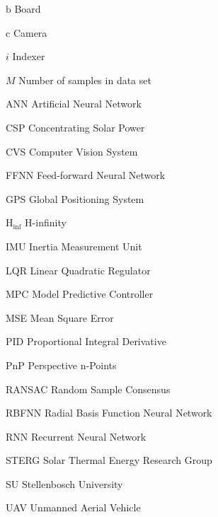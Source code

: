 \begin{Nomencl}[2cm]
   \item[$\mathrm{b}$]          Board
   \item[$\mathrm{c}$] 		Camera
   \item[$i$]			Indexer
   \item[$M$]			Number of samples in data set
\newpage
   \item[ANN]		Artificial Neural Network
   \item[CSP] 		Concentrating Solar Power
   \item[CVS] 		Computer Vision System
   \item[FFNN]		Feed-forward Neural Network
   \item[GPS] 		Global Positioning System	
   \item[H$_{\inf}$]	H-infinity 
   \item[IMU]		Inertia Measurement Unit
   \item[LQR]		Linear Quadratic Regulator
   \item[MPC]		Model Predictive Controller
   \item[MSE]		Mean Square Error
   \item[PID]		Proportional Integral Derivative
   \item[PnP]		Perspective n-Points
   \item[RANSAC]	Random Sample Consensus
   \item[RBFNN]		Radial Basis Function Neural Network
   \item[RNN]		Recurrent Neural Network
   \item[STERG]		Solar Thermal Energy Research Group
   \item[SU]		Stellenbosch University
   \item[UAV]		Unmanned Aerial Vehicle

\end{Nomencl}

\endinput
